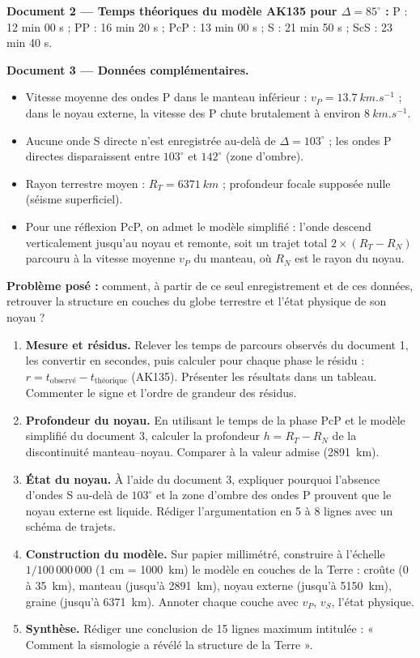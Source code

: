\documentclass[11pt]{article}
\newcommand{\cle}[1]{{\popxbold\color{popdark}#1}}
\newcounter{popsec}
\newcounter{popsub}
\newcommand{\courssub}[1]{%
  \stepcounter{popsub}%
  \par\vspace{9pt}\noindent{\popxbold\fontsize{11.5}{13}\selectfont\color{popink}{\color{poporange}\thepopsec.\thepopsub}\hspace{6pt}#1}\par\nopagebreak\vspace{4pt}
}
\begin{document}
\textbf{Document 2 — Temps théoriques du modèle AK135 pour $\Delta = 85^\circ$ :} P : 12 min 00 s ; PP : 16 min 20 s ; PcP : 13 min 00 s ; S : 21 min 50 s ; ScS : 23 min 40 s.

\textbf{Document 3 — Données complémentaires.}
\begin{itemize}
\item Vitesse moyenne des ondes P dans le manteau inférieur : $v_P = \SI{13,7}{km.s^{-1}}$ ; dans le noyau externe, la vitesse des P chute brutalement à environ $\SI{8}{km.s^{-1}}$.
\item Aucune onde S directe n'est enregistrée au-delà de $\Delta = 103^\circ$ ; les ondes P directes disparaissent entre $103^\circ$ et $142^\circ$ (zone d'ombre).
\item Rayon terrestre moyen : $R_T = \SI{6371}{km}$ ; profondeur focale supposée nulle (séisme superficiel).
\item Pour une réflexion PcP, on admet le modèle simplifié : l'onde descend verticalement jusqu'au noyau et remonte, soit un trajet total $2 \times (R_T - R_N)$ parcouru à la vitesse moyenne $v_P$ du manteau, où $R_N$ est le rayon du noyau.
\end{itemize}

\textbf{Problème posé :} comment, à partir de ce seul enregistrement et de ces données, retrouver la structure en couches du globe terrestre et l'état physique de son noyau ?

\courssub{Consignes}

\begin{enumerate}
\item \textbf{Mesure et résidus.} Relever les temps de parcours observés du document 1, les convertir en secondes, puis calculer pour chaque phase le \cle{résidu} : $r = t_{\text{observé}} - t_{\text{théorique}}$ (AK135). Présenter les résultats dans un tableau. Commenter le signe et l'ordre de grandeur des résidus.
\item \textbf{Profondeur du noyau.} En utilisant le temps de la phase PcP et le modèle simplifié du document 3, calculer la profondeur $h = R_T - R_N$ de la discontinuité manteau--noyau. Comparer à la valeur admise (\SI{2891}{km}).
\item \textbf{État du noyau.} À l'aide du document 3, expliquer pourquoi l'absence d'ondes S au-delà de $103^\circ$ et la zone d'ombre des ondes P prouvent que le noyau externe est liquide. Rédiger l'argumentation en 5 à 8 lignes avec un schéma de trajets.
\item \textbf{Construction du modèle.} Sur papier millimétré, construire à l'échelle $1/100\,000\,000$ (1 cm = \SI{1000}{km}) le modèle en couches de la Terre : croûte ($0$ à \SI{35}{km}), manteau (jusqu'à \SI{2891}{km}), noyau externe (jusqu'à \SI{5150}{km}), graine (jusqu'à \SI{6371}{km}). Annoter chaque couche avec $v_P$, $v_S$, l'état physique.
\item \textbf{Synthèse.} Rédiger une conclusion de 15 lignes maximum intitulée : « Comment la sismologie a révélé la structure de la Terre ».
\end{enumerate}
\end{document}
